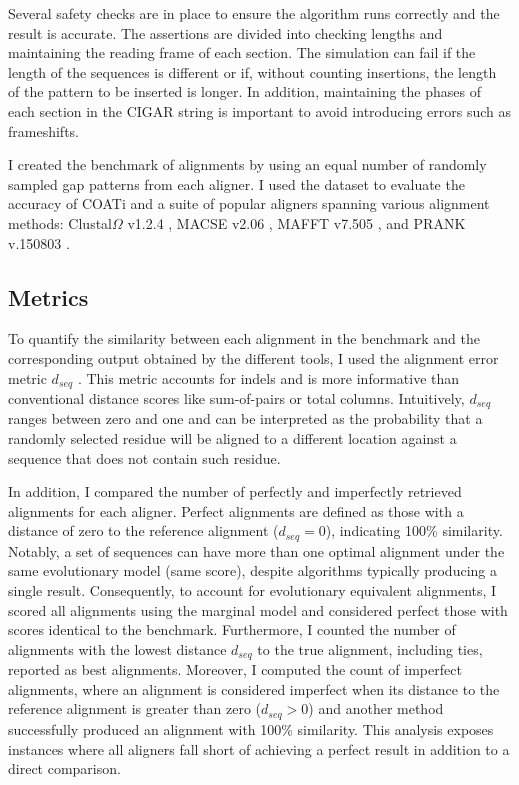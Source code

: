 Several safety checks are in place to ensure the algorithm runs correctly and the result is accurate. The assertions are divided into checking lengths and maintaining the reading frame of each section. The simulation can fail if the length of the sequences is different or if, without counting insertions, the length of the pattern to be inserted is longer. In addition, maintaining the phases of each section in the CIGAR string is important to avoid introducing errors such as frameshifts. 

I created the benchmark of alignments by using an equal number of randomly sampled gap patterns from each aligner.
I used the dataset to evaluate the accuracy of COATi and a suite of popular aligners spanning various alignment methods:
Clustal$\Omega$ v1.2.4 \citep{clustal_omega_sievers_2011},
MACSE v2.06 \citep{ranwez_macse_2011}, MAFFT v7.505
\citep{katoh2013mafft}, and PRANK v.150803 \citep{prank_loytynoja_2014}.

\subsection{Metrics}

To quantify the similarity between each alignment in the benchmark and the corresponding output obtained by the different tools, I used the alignment error metric $d_{seq}$ \citep{metrics_blackburne_whelan_2011}. This metric accounts for indels and is more informative than conventional distance scores like sum-of-pairs or total columns. Intuitively, $d_{seq}$ ranges between zero and one and can be interpreted as the probability that a randomly selected residue will be aligned to a different location against a sequence that does not contain such residue.

In addition, I compared the number of perfectly and imperfectly retrieved alignments for each aligner. Perfect alignments are defined as those with a distance of zero to the reference alignment ($d_{seq} = 0$), indicating 100\% similarity. Notably, a set of sequences can have more than one optimal alignment under the same evolutionary model (same score), despite algorithms typically producing a single result. Consequently, to account for evolutionary equivalent alignments, I scored all alignments using the marginal model and considered perfect those with scores identical to the benchmark.
Furthermore, I counted the number of alignments with the lowest distance $d_{seq}$ to the true alignment, including ties, reported as best alignments. Moreover, I computed the count of imperfect alignments, where an alignment is considered imperfect when its distance to the reference alignment is greater than zero ($d_{seq} > 0$) and another method successfully produced an alignment with 100\% similarity. This analysis exposes instances where all aligners fall short of achieving a perfect result in addition to a direct comparison.

